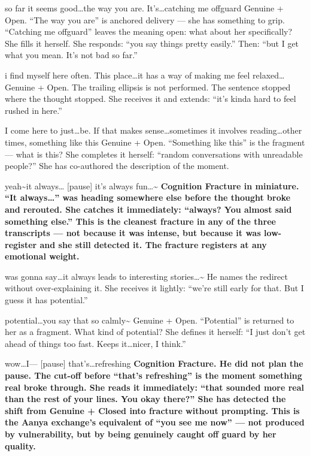 {so far it seems good\ldots the way you are. It's\ldots catching me offguard}
{Genuine + Open. ``The way you are'' is anchored delivery --- she has something to grip. ``Catching me offguard'' leaves the meaning open: what about her specifically? She fills it herself. She responds: ``you say things pretty easily.'' Then: ``but I get what you mean. It's not bad so far.''}

{i find myself here often. This place\ldots it has a way of making me feel relaxed\ldots}
{Genuine + Open. The trailing ellipsis is not performed. The sentence stopped where the thought stopped. She receives it and extends: ``it's kinda hard to feel rushed in here.''}

{I come here to just\ldots be. If that makes sense\ldots sometimes it involves reading\ldots other times, something like this}
{Genuine + Open. ``Something like this'' is the fragment --- what is this? She completes it herself: ``random conversations with unreadable people?'' She has co-authored the description of the moment.}

\thinrule

{yeah\textasciitilde it always\ldots} {[pause]} {it's always fun\ldots\textasciitilde}
{\textbf{Cognition Fracture in miniature. ``It always\ldots'' was heading somewhere else before the thought broke and rerouted. She catches it immediately: ``always? You almost said something else.'' This is the cleanest fracture in any of the three transcripts --- not because it was intense, but because it was low-register and she still detected it. The fracture registers at any emotional weight.}}

{was gonna say\ldots it always leads to interesting stories\ldots\textasciitilde}
{He names the redirect without over-explaining it. She receives it lightly: ``we're still early for that. But I guess it has potential.''}

\thinrule

{potential\ldots you say that so calmly\textasciitilde}
{Genuine + Open. ``Potential'' is returned to her as a fragment. What kind of potential? She defines it herself: ``I just don't get ahead of things too fast. Keeps it\ldots nicer, I think.''}

{wow\ldots I---} {[pause]} {that's\ldots refreshing}
{\textbf{Cognition Fracture. He did not plan the pause. The cut-off before ``that's refreshing'' is the moment something real broke through. She reads it immediately: ``that sounded more real than the rest of your lines. You okay there?'' She has detected the shift from Genuine + Closed into fracture without prompting. This is the Aanya exchange's equivalent of ``you see me now'' --- not produced by vulnerability, but by being genuinely caught off guard by her quality.}}

